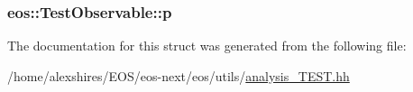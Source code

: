 \label{structeos_1_1TestObservable_af9d523ad792f2ce3afa336f09d9226a6}
\hypertarget{structeos_1_1TestObservable_ab06f6f24a04051ec2a8ebaa5d78ee953}{
\subsubsection[{p}]{ {\bf eos::TestObservable::p}}}
\label{structeos_1_1TestObservable_ab06f6f24a04051ec2a8ebaa5d78ee953}


The documentation for this struct was generated from the following file:\begin{DoxyCompactItemize}
\item 
/home/alexshires/EOS/eos-\/next/eos/utils/\hyperlink{analysis__TEST_8hh}{analysis\_\-TEST.hh}\end{DoxyCompactItemize}
